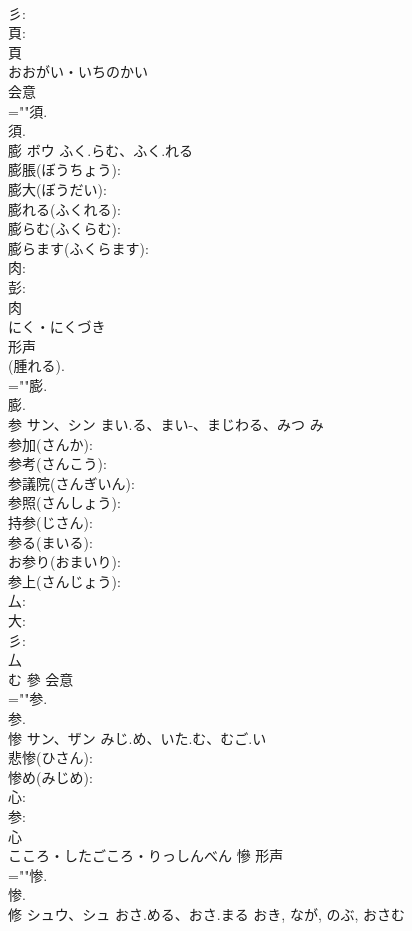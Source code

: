 \documentclass[8pt]{extreport}
\begin{document}
\begin{CJK}{UTF8}{min}
\\	彡: 
\\	頁: 
\\	頁	
\\	おおがい・いちのかい	
\\	会意 
\\	=""須.
\\	須.
\\	膨	ボウ	ふく.らむ、ふく.れる		
\\	膨脹(ぼうちょう): 
\\	膨大(ぼうだい): 
\\	膨れる(ふくれる): 
\\	膨らむ(ふくらむ): 
\\	膨らます(ふくらます): 
\\	肉: 
\\	彭: 
\\	肉	
\\	にく・にくづき	
\\	形声 
\\	(腫れる). 
\\	=""膨.
\\	膨.
\\	参	サン、シン	まい.る、まい-、まじわる、みつ	み	
\\	参加(さんか): 
\\	参考(さんこう): 
\\	参議院(さんぎいん): 
\\	参照(さんしょう): 
\\	持参(じさん): 
\\	参る(まいる): 
\\	お参り(おまいり): 
\\	参上(さんじょう): 
\\	厶: 
\\	大: 
\\	彡: 
\\	厶	
\\	む	參	会意 
\\	=""参.
\\	参.
\\	惨	サン、ザン	みじ.め、いた.む、むご.い		
\\	悲惨(ひさん): 
\\	惨め(みじめ): 
\\	心: 
\\	参: 
\\	心	
\\	こころ・したごころ・りっしんべん	慘	形声 
\\	=""惨.
\\	惨.
\\	修	シュウ、シュ	おさ.める、おさ.まる	おき, なが, のぶ, おさむ	

\end{CJK}
\end{document}
